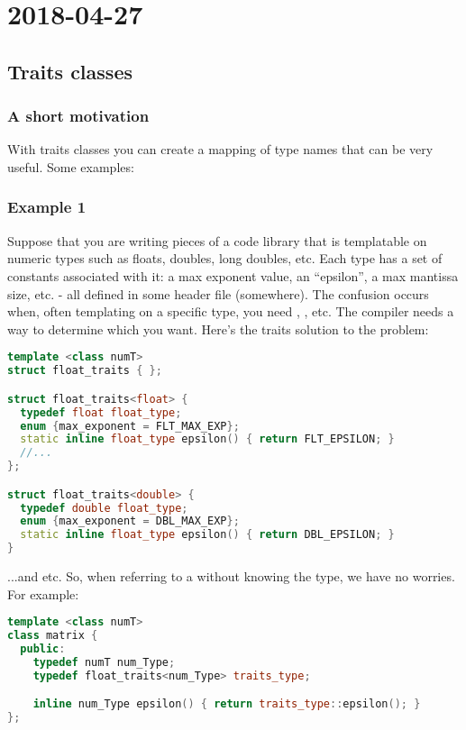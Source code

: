 \section{2018-04-27}

\subsection{Traits classes}

\subsubsection{A short motivation}

With traits classes you can create a mapping of type names that can be very useful. Some examples:


\subsubsection{Example 1}

Suppose that you are writing pieces of a code library that is templatable on numeric types such as floats, doubles, long doubles, etc. Each type has a set of constants associated with it: a max exponent value, an ``epsilon'', a max mantissa size, etc. - all defined in some header file (somewhere). The confusion occurs when, often templating on a specific type, you need , , etc. The compiler needs a way to determine which you want. Here's the traits solution to the problem:

\begin{lstlisting}[language=C++]
template <class numT>
struct float_traits { };

struct float_traits<float> {
  typedef float float_type;
  enum {max_exponent = FLT_MAX_EXP};
  static inline float_type epsilon() { return FLT_EPSILON; }
  //...
};

struct float_traits<double> {
  typedef double float_type;
  enum {max_exponent = DBL_MAX_EXP};
  static inline float_type epsilon() { return DBL_EPSILON; }
}
\end{lstlisting}

...and etc. So, when referring to a  without knowing the type, we have no worries. For example:

\begin{lstlisting}[language=C++]
template <class numT>
class matrix {
  public:
    typedef numT num_Type;
    typedef float_traits<num_Type> traits_type;

    inline num_Type epsilon() { return traits_type::epsilon(); }
};
\end{lstlisting}


